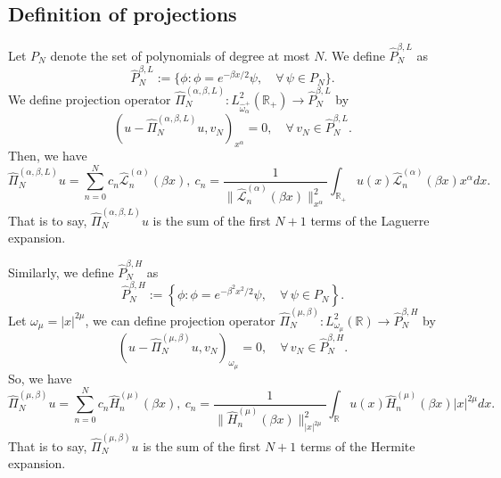 \documentclass[pdflatex,sn-aps]{sn-jnl}%
\theoremstyle{thmstyleone}%
\theoremstyle{thmstyletwo}%
\theoremstyle{thmstylethree}%
\begin{document}
\subsection{Definition of projections}
Let $P_N$ denote the set of polynomials of degree at most $N$. We define $\widehat{P}_N^{\beta,L}$ as
\begin{equation}\label{eq:def-PNHat-L}
  \widehat{P}_N^{\beta,L}:=\bigl\{\phi: \phi=e^{- \beta x / 2} \psi, \quad \forall\, \psi \in P_N\bigr\} .
\end{equation}
We define projection operator $\widehat{\Pi}_{N}^{(\alpha,\beta,L)}: L^2_{\hat{\omega}_\alpha^+}(\mathbb{R}_+) \rightarrow \widehat{P}_N^{\beta,L}$ by
\begin{equation}\label{eq:def-projHat-L}
  \left(u-\widehat{\Pi}_{N}^{(\alpha,\beta,L)} u, v_N\right)_{x^\alpha}=0, \quad \forall\, v_N \in \widehat{P}_N^{\beta,L}.
\end{equation}
Then, we have
\begin{equation}\label{eq:0709-1}
  \widehat{\Pi}_{N}^{(\alpha,\beta,L)} u=\sum_{n=0}^N c_n \widehat{\mathscr{L}}_n^{(\alpha)}(\beta x), \ c_n=\frac{1}{\bigl\|\widehat{\mathscr{L}}_n^{(\alpha)}(\beta x)\bigr\|_{x^\alpha}^2} \int_{\mathbb{R}_{+}} u(x) \widehat{\mathscr{L}}_n^{(\alpha)}(\beta x) x^\alpha d x.
\end{equation}
That is to say, $\widehat{\Pi}_{N}^{(\alpha,\beta,L)} u$ is the sum of the first
$N+1$ terms of the Laguerre expansion.

Similarly, we define $\widehat{P}_N^{\beta,H}$ as
\begin{equation}\label{eq:def-PNHat-H}
  \widehat{P}_N^{\beta,H}:=\left\{\phi: \phi=e^{- \beta^2 x^2 / 2} \psi, \quad \forall\, \psi \in P_N\right\} .
\end{equation}
Let $\omega_\mu = |x|^{2\mu}$, we can define 
projection operator $\widehat{\Pi}_{N}^{(\mu,\beta)}: L^2_{\omega_\mu}(\mathbb{R}) \rightarrow \widehat{P}_N^{\beta,H}$ by
\begin{equation}\label{eq:def-projHat-H}
  \left(u-\widehat{\Pi}_{N}^{(\mu,\beta)} u, v_N\right)_{\omega_\mu}=0, \quad \forall\, v_N \in \widehat{P}_N^{\beta,H}.
\end{equation}
So, we have
\begin{equation}\label{eq:0709-2}
  \widehat{\Pi}_{N}^{(\mu,\beta)} u=\sum_{n=0}^N c_n \widehat{H}_n^{(\mu)}(\beta x), \ 
  c_n=\frac{1}{\bigl\|\widehat{H}_n^{(\mu)}(\beta x)\bigr\|_{|x|^{2\mu}}^2} \int_{\mathbb{R}} u(x) \widehat{H}_n^{(\mu)}(\beta x) |x|^{2\mu} d x.
\end{equation}
That is to say, $\widehat{\Pi}_{N}^{(\mu,\beta)} u$ is the sum of the first
$N+1$ terms of the Hermite expansion.
\end{document}
